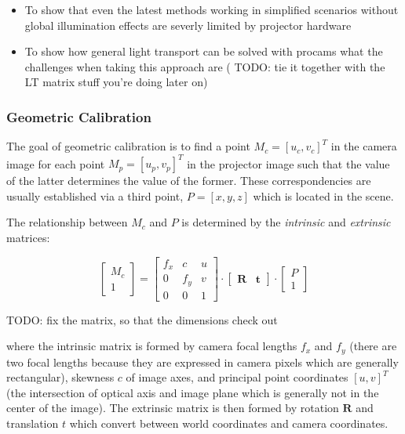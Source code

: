 \begin{itemize}
    \item To show that even the latest methods working in simplified scenarios without global illumination effects are severly limited by projector hardware
    \item To show how general light transport can be solved with procams what the challenges when taking this approach are ({\color{red} TODO: tie it together with the LT matrix stuff you're doing later on})
\end{itemize}

\subsubsection{Geometric Calibration}
\label{section:background-projection_mapping-procams-geometric_calibration}

The goal of geometric calibration is to find a point \(M_c = [u_c, v_c]^T\) in the camera image for each point \(M_p = [u_p, v_p]^T\) in the projector image such that the value of the latter determines the value of the former. These correspondencies are usually established via a third point, \(P = [x, y, z]\) which is located in the scene.

The relationship between \(M_c\) and \(P\) is determined by the \textit{intrinsic} and \textit{extrinsic} matrices:

\begin{equation}
    \label{eq:camera_equation}
    \begin{bmatrix}
        M_c \\
        1
    \end{bmatrix} =
    \begin{bmatrix}
        f_x & c & u \\
        0 & f_y & v \\
        0 & 0 & 1 
    \end{bmatrix} \cdot
    \begin{bmatrix}
        \mathbf{R} & \mathbf{t}
    \end{bmatrix} \cdot
    \begin{bmatrix}
        P \\
        1
    \end{bmatrix}
\end{equation}

{\color{red} TODO: fix the matrix, so that the dimensions check out}

where the intrinsic matrix is formed by camera focal lengths \(f_x\) and \(f_y\) (there are two focal lengths because they are expressed in camera pixels which are generally rectangular), skewness \(c\) of image axes, and principal point coordinates \([u, v]^T\) (the intersection of optical axis and image plane which is generally not in the center of the image). The extrinsic matrix is then formed by rotation \(\mathbf{R}\) and translation \(t\) which convert between world coordinates and camera coordinates.

